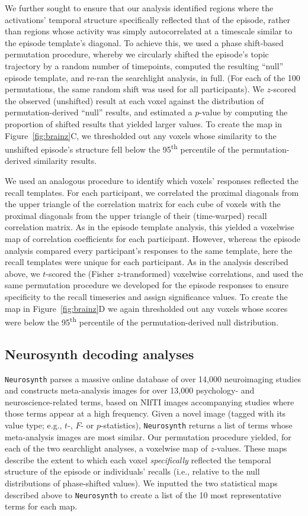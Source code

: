 \documentclass[10pt]{article}
\begin{document}
We further sought to ensure that our analysis identified regions where the activations’ temporal structure specifically reflected that of the episode, rather than regions whose activity was simply autocorrelated at a timescale similar to the episode template’s diagonal.  To achieve this, we used a phase shift-based permutation procedure, whereby we circularly shifted the episode’s topic trajectory by a random number of timepoints, computed the resulting ``null'' episode template, and re-ran the searchlight analysis, in full.  (For each of the 100 permutations, the same random shift was used for all participants).  We $z$-scored the observed (unshifted) result at each voxel against the distribution of permutation-derived ``null'' results, and estimated a $p$-value by computing the proportion of shifted results that yielded larger values.  To create the map in Figure~\ref{fig:brainz}C, we thresholded out any voxels whose similarity to the unshifted episode’s structure fell below the 95\textsuperscript{th} percentile of the permutation-derived similarity results.

We used an analogous procedure to identify which voxels' responses reflected the recall templates.  For each participant, we correlated the proximal diagonals from the upper triangle of the correlation matrix for each cube of voxels with the proximal diagonals from the upper triangle of their (time-warped) recall correlation matrix.  As in the episode template analysis, this yielded a voxelwise map of correlation coefficients for each participant.  However, whereas the episode analysis compared every participant's responses to the same template, here the recall templates were unique for each participant.  As in the analysis described above, we $t$-scored the (Fisher $z$-transformed) voxelwise correlations, and used the same permutation procedure we developed for the episode responses to ensure specificity to the recall timeseries and assign significance values.  To create the map in Figure~\ref{fig:brainz}D we again thresholded out any voxels whose scores were below the 95\textsuperscript{th} percentile of the permutation-derived null distribution.

\subsection*{Neurosynth decoding analyses}
\texttt{Neurosynth} parses a massive online database of over 14,000 neuroimaging studies and constructs meta-analysis images for over 13,000 psychology- and neuroscience-related terms, based on NIfTI images accompanying studies where those terms appear at a high frequency.  Given a novel image (tagged with its value type; e.g., $t$-, $F$- or $p$-statistics), \texttt{Neurosynth} returns a list of terms whose meta-analysis images are most similar.  Our permutation procedure yielded, for each of the two searchlight analyses, a voxelwise map of $z$-values.  These maps describe the extent to which each voxel \textit{specifically} reflected the temporal structure of the episode or individuals' recalls (i.e., relative to the null distributions of phase-shifted values). We inputted the two statistical maps described above to \texttt{Neurosynth} to create a list of the 10 most representative terms for each map.
\end{document}
